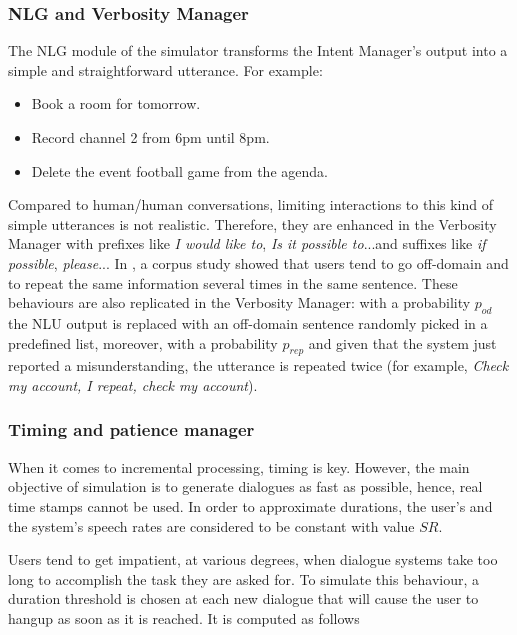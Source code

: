 			
			\subsubsection{NLG and Verbosity Manager}
				
				The NLG module of the simulator transforms the Intent Manager's output into a simple and straightforward utterance. For example:
				
				\begin{itemize}
					\item Book a room for tomorrow.
					\item Record channel 2 from 6pm until 8pm.
					\item Delete the event football game from the agenda.
				\end{itemize}
				
				Compared to human/human conversations, limiting interactions to this kind of simple utterances is not realistic. Therefore, they are enhanced in the Verbosity Manager with prefixes like \textit{I would like to}, \textit{Is it possible to}...and suffixes like \textit{if possible}, \textit{please}... In \cite{Ghigi2014}, a corpus study showed that users tend to go off-domain and to repeat the same information several times in the same sentence. These behaviours are also replicated in the Verbosity Manager: with a probability $p_{od}$ the NLU output is replaced with an off-domain sentence randomly picked in a predefined list, moreover, with a probability $p_{rep}$ and given that the system just reported a misunderstanding, the utterance is repeated twice (for example, \textit{Check my account, I repeat, check my account}).
			
			\subsubsection{Timing and patience manager}
			
				When it comes to incremental processing, timing is key. However, the main objective of simulation is to generate dialogues as fast as possible, hence, real time stamps cannot be used. In order to approximate durations, the user's and the system's speech rates are considered to be constant with value $SR$.
					
					Users tend to get impatient, at various degrees, when dialogue systems take too long to accomplish the task they are asked for. To simulate this behaviour, a duration threshold is chosen at each new dialogue that will cause the user to hangup as soon as it is reached. It is computed as follows
					
